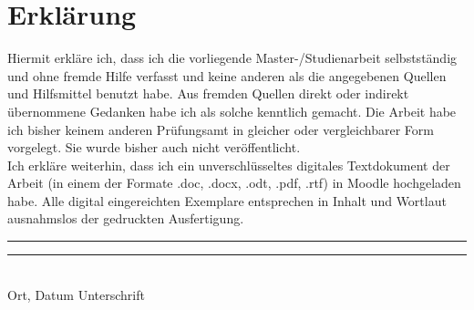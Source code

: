 
\clearpage
\chapter*{Erklärung}


Hiermit erkläre ich, dass ich die vorliegende Master-/Studienarbeit selbstständig und ohne fremde Hilfe verfasst und keine anderen als die angegebenen Quellen und Hilfsmittel benutzt habe. Aus fremden Quellen direkt oder indirekt übernommene Gedanken habe ich als solche kenntlich gemacht. Die Arbeit habe ich bisher keinem anderen Prüfungsamt in gleicher oder vergleichbarer Form vorgelegt. Sie wurde bisher auch nicht veröffentlicht. \\
Ich erkläre weiterhin, dass ich ein unverschlüsseltes digitales Textdokument der Arbeit (in einem der Formate .doc, .docx, .odt, .pdf, .rtf) in Moodle hochgeladen habe. Alle digital eingereichten Exemplare entsprechen in Inhalt und Wortlaut ausnahmslos der gedruckten Ausfertigung.

\vspace{3cm}
\rule{7cm}{0.5pt} \hfill \rule{7cm}{0.5pt} \\
Ort, Datum \hspace{6.6cm} Unterschrift
